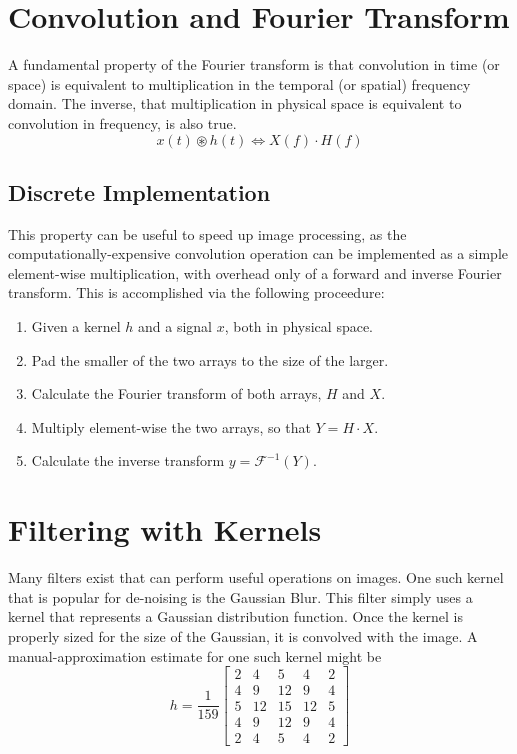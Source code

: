 \section{Convolution and Fourier Transform}
A fundamental property of the Fourier transform is that convolution in time (or space) is equivalent to multiplication in the temporal (or spatial) frequency domain. The inverse, that multiplication in physical space is equivalent to convolution in frequency, is also true. 
\begin{equation}
x(t) \circledast h(t) \Longleftrightarrow X(f) \cdot H(f)
\end{equation}
\subsection*{Discrete Implementation}
This property can be useful to speed up image processing, as the computationally-expensive convolution operation can be implemented as a simple element-wise multiplication, with overhead only of a forward and inverse Fourier transform. This is accomplished via the following proceedure:
\begin{enumerate}
	\item Given a kernel $h$ and a signal $x$, both in physical space.
	\item Pad the smaller of the two arrays to the size of the larger.
	\item Calculate the Fourier transform of both arrays, $H$ and $X$.
	\item Multiply element-wise the two arrays, so that $Y= H\cdot X$.
	\item Calculate the inverse transform $y = \mathcal{F}^{-1}( Y )$.
\end{enumerate}

\section{Filtering with Kernels}
Many filters exist that can perform useful operations on images. One such kernel that is popular for de-noising is the Gaussian Blur. This filter simply uses a kernel that represents a Gaussian distribution function. Once the kernel is properly sized for the size of the Gaussian, it is convolved with the image. A manual-approximation estimate for one such kernel might be
\begin{equation}
h =\frac{1}{159}\begin{bmatrix} 
2 & 4 & 5 & 4 & 2 \\
4 & 9 & 12 & 9 & 4 \\
5 & 12 & 15 & 12 & 5 \\
4 & 9 & 12 & 9 & 4 \\
2 & 4 & 5 & 4 & 2
\end{bmatrix}
\end{equation}
